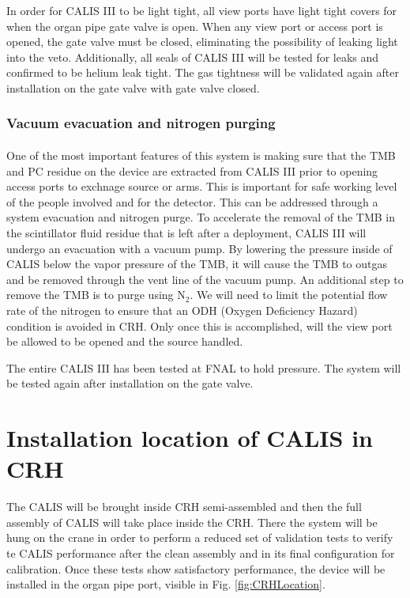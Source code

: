    In order for CALIS III to be light tight, all view ports have light tight covers for when the organ pipe gate valve is open. When any view port or access port is opened, the gate valve must be closed, eliminating the possibility of leaking light into the veto. Additionally, all seals of CALIS III will be tested for leaks and confirmed to be helium leak tight. The gas tightness will be validated again after installation on the gate valve with gate valve closed. 
	
 \subsubsection{Vacuum evacuation and nitrogen purging}
 \paragraph{}
   One of the most important features of this system is making sure that the TMB and PC residue on the device are extracted from CALIS III prior to opening access ports to exchnage source or arms. This is  important for  safe working level of the people involved and for the detector.  This can be addressed through a system evacuation and nitrogen purge.  To accelerate the removal of the TMB in the scintillator fluid residue that is left after a deployment, CALIS III will undergo an evacuation with a vacuum pump. By lowering the pressure inside of CALIS below the vapor pressure of the TMB, it will cause the TMB to outgas and be removed through the vent line of the vacuum pump. An additional step to remove the TMB is to purge using N$_{2}$.  We will need to limit the potential flow rate of the nitrogen to ensure that an ODH (Oxygen Deficiency Hazard) condition is avoided in CRH.  Only once this is accomplished, will the view port be allowed to be opened and the source handled.     
  
The entire CALIS III  has been tested at FNAL  to hold pressure.  The system will be tested again after installation on the gate valve.

\section{Installation location of CALIS in CRH}
The CALIS will be brought inside CRH semi-assembled and then the full assembly of CALIS will take place inside the CRH. There the system will be hung on the crane in order to perform a reduced set of validation tests to verify te CALIS performance after the clean assembly and in its final configuration for calibration.    Once these tests show satisfactory performance, the device will be installed in the organ pipe port, visible in Fig. \ref{fig:CRHLocation}.  

